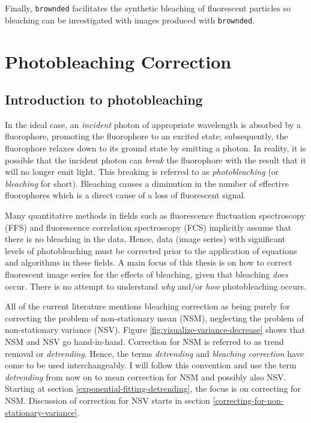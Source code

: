 \documentclass[12pt,]{book}
\theoremstyle{definition}
\theoremstyle{definition}
\theoremstyle{definition}
\theoremstyle{remark}
\let\BeginKnitrBlock\begin \let\EndKnitrBlock\end
\begin{document}
Finally, \texttt{brownded} facilitates the synthetic bleaching of
fluorescent particles so bleaching can be investigated with images
produced with \texttt{brownded}.

\chapter{Photobleaching Correction}\label{photobleaching-correction}

\section{Introduction to
photobleaching}\label{introduction-to-photobleaching}

In the ideal case, an \emph{incident} photon of appropriate wavelength
is absorbed by a fluorophore, promoting the fluorophore to an excited
state; subsequently, the fluorophore relaxes down to its ground state by
emitting a photon. In reality, it is possible that the incident photon
can \emph{break} the fluorophore with the result that it will no longer
emit light. This breaking is referred to as \emph{photobleaching} (or
\emph{bleaching} for short). Bleaching causes a diminution in the number
of effective fluorophores which is a direct cause of a loss of
fluorescent signal.

Many quantitative methods in fields such as fluorescence fluctuation
spectroscopy (FFS) and fluorescence correlation spectroscopy (FCS)
implicitly assume that there is no bleaching in the data. Hence, data
(image series) with significant levels of photobleaching must be
corrected prior to the application of equations and algorithms in these
fields. A main focus of this thesis is on how to correct fluorescent
image series for the effects of bleaching, given that bleaching
\emph{does} occur. There is no attempt to understand \emph{why} and/or
\emph{how} photobleaching occurs.

\BeginKnitrBlock{remark}
\iffalse{} {Remark. } \fi{}All of the current literature mentions
bleaching correction as being purely for correcting the problem of
non-stationary mean (NSM), neglecting the problem of non-stationary
variance (NSV). Figure \ref{fig:visualize-variance-decrease} shows that
NSM and NSV go hand-in-hand. Correction for NSM is referred to as trend
removal or \emph{detrending}. Hence, the terms \emph{detrending} and
\emph{bleaching correction} have come to be used interchangeably. I will
follow this convention and use the term \emph{detrending} from now on to
mean correction for NSM and possibly also NSV. Starting at section
\ref{exponential-fitting-detrending}, the focus is on correcting for
NSM. Discussion of correction for NSV starts in section
\ref{correcting-for-non-stationary-variance}.
\EndKnitrBlock{remark}
\end{document}

